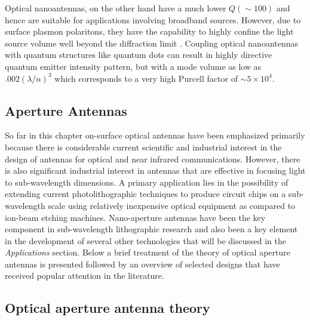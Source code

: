 \documentclass[11pt]{article}
\begin{document}
Optical nanoantennas, on the other hand have a much lower $Q (\sim 100)$ \cite{curtothesis} and hence are suitable for applications involving broadband sources. However, due to surface plasmon polaritons, they have the capability to highly confine the light source volume well beyond the diffraction limit \cite{Maier2006,Barthes2011}. Coupling optical nanoantennas with quantum structures like quantum dots can result in highly directive quantum emitter intensity pattern, but with a mode volume as low as $.002 \left(\lambda/n \right)^3$ \cite{curtothesis} which corresponds to a very high Purcell factor of $\sim 5 \times 10^4$.
\subsection{Aperture Antennas}

So far in this chapter on-surface optical antennas have been emphasized primarily because there is considerable current scientific and industrial interest in the design of antennas for optical and near infrared communications. However, there is also significant industrial interest in antennas that are effective in focusing light to sub-wavelength dimensions. A primary application lies in the possibility of extending current photolithographic techniques to produce circuit chips on a sub-wavelength scale using relatively inexpensive optical equipment as compared to ion-beam etching machines. Nano-aperture antennas have been the key component in sub-wavelength lithographic research and also been a key element in the development of several other technologies that will be discussed in the \emph{Applications} section. Below a brief treatment of the theory of optical aperture antennas is presented followed by an overview of selected designs that have received popular attention in the literature.
\subsection{Optical aperture antenna theory}
\end{document}

